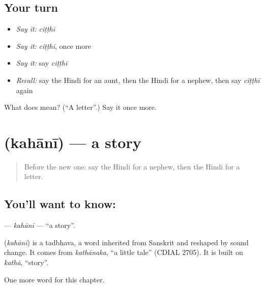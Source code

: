 \subsection*{Your turn}
\begin{itemize}
\raggedright
  \item \emph{Say it:} \emph{ciṭṭhī}
  \item \emph{Say it:} \emph{ciṭṭhī}, once more
  \item \emph{Say it:} say \emph{ciṭṭhī}
  \item \emph{Recall:} say the Hindi for an aunt, then the Hindi for a nephew, then say \emph{ciṭṭhī} again
\end{itemize}

\begin{tcolorbox}[breakable,colback=teal!4,colframe=teal!35!black,title={Before you move on}]
What does  mean? (\textquotedblleft{}A letter\textquotedblright{}.) Say it once more.
\end{tcolorbox}
\section[\texorpdfstring{\hi{कहानी} (kahānī)}{कहानी (kahānī)}]{ (kahānī) — a story}

\label{lesson:HI-C189-kahani}



\begin{quote}
Before the new one: say the Hindi for a nephew, then the Hindi for a letter.
\end{quote}

\subsection*{You'll want to know: }
\textbf{} — \emph{kahānī} — \textquotedblleft{}a story\textquotedblright{}.

\begin{cousinweb}
\textbf{} (\emph{kahānī}) is a tadbhava, a word inherited from Sanskrit and reshaped by sound change. It comes from \emph{kathānaka}, \textquotedblleft{}a little tale\textquotedblright{} (CDIAL 2705). It is built on \emph{kathā}, \textquotedblleft{}story\textquotedblright{}.
\end{cousinweb}

\begin{grammarlens}[title={What you've built}]
One more word for this chapter.
\end{grammarlens}

